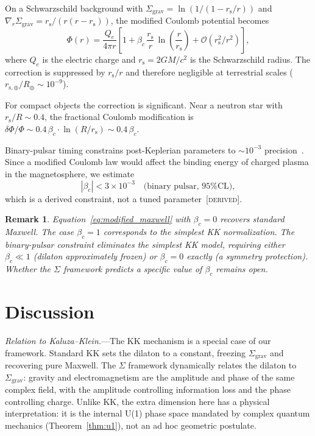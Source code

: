 \documentclass[prl,twocolumn,superscriptaddress,longbibliography]{revtex4-2}
\newtheorem*{remark}{Remark}
\newcommand{\Sgrav}{\Sigma_{\mathrm{grav}}}
\newcommand{\rs}{r_{\mathrm{s}}}
\newcommand{\derived}{\textsc{[derived]}}
\begin{document}
On a Schwarzschild background with
$\Sgrav = \ln(1/(1 - \rs/r))$ and
$\nabla_r\Sgrav = \rs/(r(r - \rs))$, the modified Coulomb
potential becomes
\begin{equation}
  \Phi(r) = \frac{Q_e}{4\pi r}\!\left[
  1 + \beta_c\,\frac{\rs}{r}\,
  \ln\!\left(\frac{r}{\rs}\right)
  + \mathcal{O}(\rs^2/r^2)\right],
  \label{eq:modified_coulomb}
\end{equation}
where $Q_e$ is the electric charge and $\rs = 2GM/c^2$ is the
Schwarzschild radius.
The correction is suppressed by $\rs/r$ and therefore
negligible at terrestrial scales ($r_{\mathrm{s},\oplus}/R_\oplus
\sim 10^{-9}$).

For compact objects the correction is significant.
Near a neutron star with $\rs/R \sim 0.4$, the fractional
Coulomb modification is
$\delta\Phi/\Phi \sim 0.4\,\beta_c \cdot
\ln(R/\rs) \sim 0.4\,\beta_c$.

Binary-pulsar timing constrains post-Keplerian parameters to
$\sim 10^{-3}$
precision~\cite{Stairs2003,Kramer2021}.
Since a modified Coulomb law would affect the binding energy of
charged plasma in the magnetosphere, we estimate
\begin{equation}
  |\beta_c| < 3 \times 10^{-3}
  \quad\text{(binary pulsar, 95\% CL)},
  \label{eq:beta_constraint}
\end{equation}
which is a derived constraint, not a tuned
parameter~\derived{}.

\begin{remark}
Equation~\eqref{eq:modified_maxwell} with $\beta_c = 0$
recovers standard Maxwell.
The case $\beta_c = 1$ corresponds to the simplest KK
normalization.
The binary-pulsar constraint eliminates the simplest
KK model, requiring either $\beta_c \ll 1$ (dilaton
approximately frozen) or $\beta_c = 0$ exactly (a symmetry
protection).
Whether the $\Sigma$ framework predicts a specific value of
$\beta_c$ remains open.
\end{remark}

\section{Discussion}
\label{sec:discussion}

\textit{Relation to Kaluza--Klein.}---The KK mechanism is a
special case of our framework.
Standard KK sets the dilaton to a constant, freezing
$\Sgrav$ and recovering pure Maxwell.
The $\Sigma$ framework dynamically relates the dilaton to
$\Sgrav$: gravity and electromagnetism are the amplitude and
phase of the same complex field, with the amplitude controlling
information loss and the phase controlling charge.
Unlike KK, the extra dimension here has a physical
interpretation: it is the internal U(1) phase space mandated
by complex quantum mechanics (Theorem~\ref{thm:u1}), not an ad
hoc geometric postulate.
\end{document}
